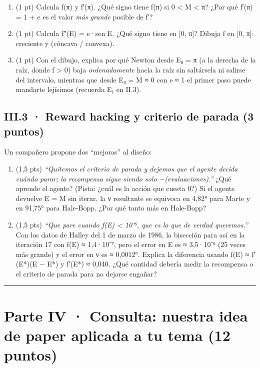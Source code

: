 \begin{enumerate}
\def\labelenumi{\alph{enumi})}
\item
  (1 pt) Calcula f(π) y f′(π). ¿Qué signo tiene f(π) si 0 \textless{} M \textless{} π? ¿Por qué f′(π) = 1 + e es el valor \emph{más grande} posible de f′?
\item
  (1 pt) Calcula f″(E) = e·sen E. ¿Qué signo tiene en {[}0, π{]}? Dibuja f en {[}0, π{]}: creciente y  (cóncava / convexa).
\item
  (1 pt) Con el dibujo, explica por qué Newton desde E₀ = π (a la derecha de la raíz, donde f \textgreater{} 0) baja \emph{ordenadamente} hacia la raíz sin saltársela ni salirse del intervalo, mientras que desde E₀ = M ≈ 0 con e ≈ 1 el primer paso puede mandarte lejísimos (recuerda E₁ en II.3).
\end{enumerate}

\subsection{III.3 · Reward hacking y criterio de parada (3 puntos)}

Un compañero propone dos ``mejoras'' al diseño:

\begin{enumerate}
\def\labelenumi{\alph{enumi})}
\item
  (1,5 pts) \emph{``Quitemos el criterio de parada y dejemos que el agente decida cuándo parar; la recompensa sigue siendo solo −(evaluaciones).''} ¿Qué aprende el agente? (Pista: ¿cuál es la acción que cuesta 0?) Si el agente devuelve E = M sin iterar, la ν resultante se equivoca en 4,82° para Marte y en 91,75° para Hale-Bopp. ¿Por qué tanto más en Hale-Bopp?
\item
  (1,5 pts) \emph{``Que pare cuando \textbar f(E)\textbar{} \textless{} 10⁻⁶, que es lo que de verdad queremos.''} Con los datos de Halley del 1 de marzo de 1986, la bisección para así en la iteración 17 con \textbar f(E)\textbar{} ≈ 1,4·10⁻⁷, pero el error en E es ≈ 3,5·10⁻⁶ (25 veces más grande) y el error en ν es ≈ 0,0012°. Explica la diferencia usando f(E) ≈ f′(E*)(E − E*) y f′(E*) ≈ 0,040. ¿Qué cantidad debería medir la recompensa o el criterio de parada para no dejarse engañar?
\end{enumerate}

\begin{center}\rule{0.5\linewidth}{0.5pt}\end{center}

\section{Parte IV · Consulta: nuestra idea de paper aplicada a tu tema (12 puntos)}

